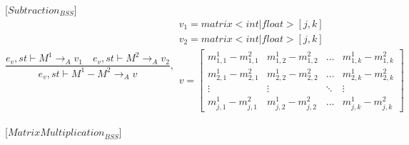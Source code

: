 [${Subtraction}_{BSS}$]
\begin{equation}
	\frac { { e }_{ v },st\vdash { M }^{ 1 }{ \rightarrow  }_{ A }{ v }_{ 1 }\quad { e }_{ v },st\vdash { M }^{ 2 }{ \rightarrow  }_{ A }{ v }_{ 2 } }{ { e }_{ v },st\vdash { M }^{ 1 }-{ M }^{ 2 }{ \rightarrow  }_{ A }{ v } } ,\begin{matrix} { v }_{ 1 }=matrix<int|float>[j,k] \\ { v }_{ 2 }=matrix<int|float>[j,k] \\ v=\begin{bmatrix} { { m }_{ 1,1 }^{ 1 } } - { { m }_{ 1,1 }^{ 2 } } & { { m }_{ 1,2 }^{ 1 } } - { { m }_{ 1,2 }^{ 2 } } & \dots  & { m }_{ 1,k }^{ 1 } - { { m }_{ 1,k }^{ 2} } \\
{ { m }_{ 2,1 }^{ 1 } } - { { m }_{ 2,1 }^{ 2 } } &  { { m }_{ 2,2 }^{ 1 } } - { { m }_{ 2,2 }^{ 2 } } & \dots & { { m }_{ 2,k }^{ 1 } }  - { { m }_{ 2,k }^{ 2 } }
\\ \vdots  & \vdots & \ddots  & \vdots \\
 { m }_{ j,1 }^{ 1 } - { { m }_{ j,1 }^{ 2 } } & { { m }_{ j,2 }^{ 1 } } - { { m }_{ j,2 }^{ 2 } }  & \dots & { m }_{ j,k }^{ 1 } - { { m }_{ j,k }^{ 2 } } \end{bmatrix} \end{matrix}
\end{equation}


[${MatrixMultiplication}_{BSS}$]

